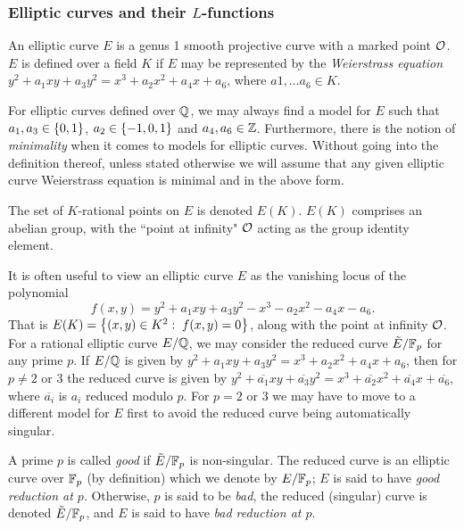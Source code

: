 \documentclass[10pt]{article}
\begin{document}
\subsubsection{Elliptic curves and their $L$-functions}

\begin{definition}
An elliptic curve $E$ is a genus 1 smooth projective curve with a marked point $\mathcal{O}$. $E$ is defined over a field $K$ if $E$ may be represented by the {\it Weierstrass equation} $y^2 + a_1 xy + a_3 y^2 = x^3 + a_2 x^2 + a_4 x + a_6$, where $a1,\ldots a_6 \in K$.
\end{definition}

For elliptic curves defined over $\mathbb{Q}$, we may always find a model for $E$ such that $a_1, a_3 \in \left\{0,1\right\}$, $a_2 \in \left\{-1,0,1\right\}$ and $a_4,a_6 \in \mathbb{Z}$. Furthermore, there is the notion of {\it minimality} when it comes to models for elliptic curves. Without going into the definition thereof, unless stated otherwise we will assume that any given elliptic curve Weierstrass equation is minimal and in the above form.

\begin{definition}
The set of $K$-rational points on $E$ is denoted $E(K)$. $E(K)$ comprises an abelian group, with the ``point at infinity" $\mathcal{O}$ acting as the group identity element.
\end{definition}

It is often useful to view an elliptic curve $E$ as the vanishing locus of the polynomial
\begin{equation}\label{eqn:E_poly}
f(x,y) = y^2 + a_1 xy + a_3 y^2 - x^3 - a_2 x^2 - a_4 x - a_6.
\end{equation}
 That is $E(K) = \left\{(x,y) \in K^2: \; f(x,y) = 0\right\}$, along with the point at infinity $\mathcal{O}$. \\

For a rational elliptic curve $E/\mathbb{Q}$, we may consider the reduced curve $\tilde{E}/\mathbb{F}_p$ for any prime $p$. If $E/\mathbb{Q}$ is given by $y^2 + a_1 xy + a_3 y^2 = x^3 + a_2 x^2 + a_4 x + a_6$, then for $p\ne 2$ or $3$ the reduced curve is given by $y^2 + \overline{a_1} xy + \overline{a_3} y^2 = x^3 + \overline{a_2} x^2 + \overline{a_4} x + \overline{a_6}$, where $\overline{a_i}$ is $a_i$ reduced modulo $p$. For $p = 2$ or $3$ we may have to move to a different model for $E$ first to avoid the reduced curve being automatically singular.

\begin{definition}
A prime $p$ is called {\it good} if $\tilde{E}/\mathbb{F}_p$ is non-singular. The reduced curve is an elliptic curve over $\mathbb{F}_p$ (by definition) which we denote by $E/\mathbb{F}_p$; $E$ is said to have {\it good reduction at $p$}. Otherwise, $p$ is said to be {\it bad}, the reduced (singular) curve is denoted $\tilde{E}/\mathbb{F}_p$, and $E$ is said to have {\it bad reduction at $p$}.
\end{definition}
\end{document}
